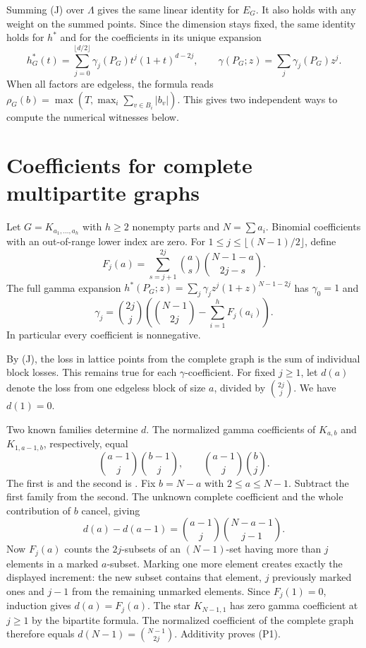 \documentclass[11pt,a4paper]{article}
\theoremstyle{definition}\newtheorem{problem}[theorem]{Problem}
\begin{document}
Summing (J) over $\Lambda$ gives the same linear identity for $E_G$. It also holds with any weight on the summed points. Since the dimension stays fixed, the same identity holds for $h^*$ and for the coefficients in its unique expansion
\[
 h_G^*(t)=\sum_{j=0}^{\lfloor d/2\rfloor}\gamma_j(P_G)t^j(1+t)^{d-2j},\qquad
 \gamma(P_G;z)=\sum_j\gamma_j(P_G)z^j .
\]
When all factors are edgeless, the formula reads $\rho_G(b)=\max(T,\max_i\sum_{v\in B_i}|b_v|)$. This gives two independent ways to compute the numerical witnesses below.

\section{Coefficients for complete multipartite graphs}
Let $G=K_{a_1,\ldots,a_h}$ with $h\ge2$ nonempty parts and $N=\sum a_i$. Binomial coefficients with an out-of-range lower index are zero. For $1\le j\le\lfloor(N-1)/2\rfloor$, define
\[
 F_j(a)=\sum_{s=j+1}^{2j}\binom{a}{s}\binom{N-1-a}{2j-s}.
\]
The full gamma expansion $h^*(P_G;z)=\sum_j\gamma_j z^j(1+z)^{N-1-2j}$ has $\gamma_0=1$ and
\[
 \gamma_j=\binom{2j}{j}\left(\binom{N-1}{2j}-\sum_{i=1}^h F_j(a_i)\right).\tag{P1}
\]
In particular every coefficient is nonnegative.

By (J), the loss in lattice points from the complete graph is the sum of individual block losses. This remains true for each $\gamma$-coefficient. For fixed $j\ge1$, let $d(a)$ denote the loss from one edgeless block of size $a$, divided by $\binom{2j}{j}$. We have $d(1)=0$.

Two known families determine $d$. The normalized gamma coefficients of $K_{a,b}$ and $K_{1,a-1,b}$, respectively, equal
\[
 \binom{a-1}{j}\binom{b-1}{j},\qquad
 \binom{a-1}{j}\binom{b}{j}.
\]
The first is \cite[Theorem~4.1]{HJM} and the second is \cite[Proposition~3.1(a)]{Kolbl}. Fix $b=N-a$ with $2\le a\le N-1$. Subtract the first family from the second. The unknown complete coefficient and the whole contribution of $b$ cancel, giving
\[
 d(a)-d(a-1)=\binom{a-1}{j}\binom{N-a-1}{j-1}.
\]
Now $F_j(a)$ counts the $2j$-subsets of an $(N-1)$-set having more than $j$ elements in a marked $a$-subset. Marking one more element creates exactly the displayed increment: the new subset contains that element, $j$ previously marked ones and $j-1$ from the remaining unmarked elements. Since $F_j(1)=0$, induction gives $d(a)=F_j(a)$. The star $K_{N-1,1}$ has zero gamma coefficient at $j\ge1$ by the bipartite formula. The normalized coefficient of the complete graph therefore equals $d(N-1)=\binom{N-1}{2j}$. Additivity proves (P1).
\end{document}
